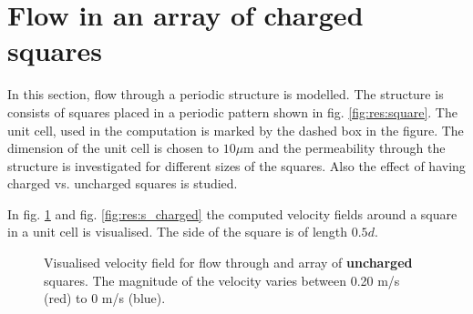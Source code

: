 \section{Flow in an array of charged squares}

In this section, flow through a periodic structure is modelled. The
structure is consists of squares placed in a periodic pattern shown in
fig. \ref{fig:res:square}. The unit cell, used in the computation is
marked by the dashed box in the figure. The dimension of the unit cell
is chosen to $10 \mu$m and the permeability through the structure is
investigated for different sizes of the squares. Also the effect of
having charged vs. uncharged squares is studied. 

In fig. \ref{fig:res:s_uncharged} and fig. \ref{fig:res:s_charged} the
computed velocity fields around a square in a unit cell is
visualised. The side of the square is of length $0.5d$.   

\begin{figure}
  \centering
  \hspace{5pt} 
  \caption[Velocity field for flow through and array of
    uncharged squares.]{Visualised velocity field for flow
    through and array of \textbf{uncharged} squares. The magnitude of
    the velocity varies between 0.20 m/s (red) to 0 m/s (blue).}
  \label{fig:res:s_uncharged}
\end{figure}



